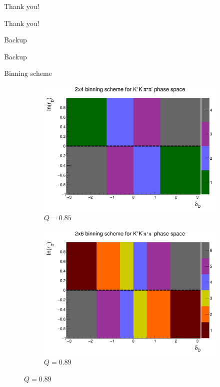 \documentclass{beamer}
\begin{document}
\begin{frame}{Thank you!}
  \begin{center}
    {\huge Thank you!}
  \end{center}
\end{frame}

\begin{frame}{Backup}
  \begin{center}
    {\huge Backup}
  \end{center}
\end{frame}

\begin{frame}{Binning scheme}
  \begin{figure}
    \centering
    \vspace{-0.2cm}
    \begin{subfigure}{0.5\textwidth}
      \includegraphics[width = 1.0\textwidth]{Plots/BinningSchemePlot_4Bins.png}
      \caption{$Q = 0.85$}
    \end{subfigure}%
    \begin{subfigure}{0.5\textwidth}
      \includegraphics[width = 1.0\textwidth]{Plots/BinningSchemePlot_6Bins.png}
      \caption{$Q = 0.89$}
    \end{subfigure}
  \end{figure}
\end{frame}
\end{document}

